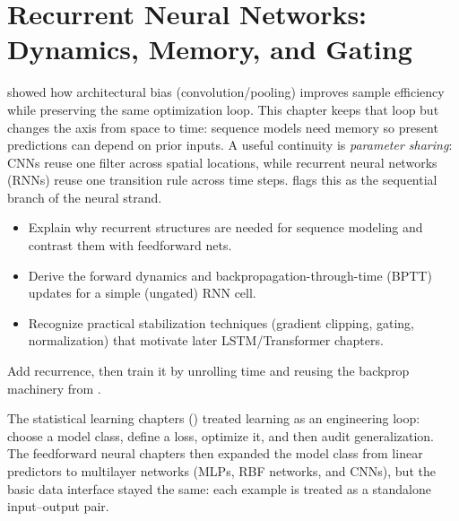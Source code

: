\section{Recurrent Neural Networks: Dynamics, Memory, and Gating}\label{chap:rnn}
\graphicspath{{assets/lec7/}{assets/lec9/}{assets/lec14/}}

 showed how architectural bias (convolution/pooling) improves sample efficiency while preserving the same optimization loop. This chapter keeps that loop but changes the axis from space to time: sequence models need memory so present predictions can depend on prior inputs. A useful continuity is \emph{parameter sharing}: CNNs reuse one filter across spatial locations, while recurrent neural networks (RNNs) reuse one transition rule across time steps.  flags this as the sequential branch of the neural strand.

\begin{tcolorbox}[summarybox, title={Learning Outcomes}]
\begin{itemize}
    \item Explain why recurrent structures are needed for sequence modeling and contrast them with feedforward nets.
    \item Derive the forward dynamics and backpropagation-through-time (BPTT) updates for a simple (ungated) RNN cell.
    \item Recognize practical stabilization techniques (gradient clipping, gating, normalization) that motivate later LSTM/Transformer chapters.
\end{itemize}
\end{tcolorbox}

\begin{tcolorbox}[summarybox, title={Design motif}]
Add recurrence, then train it by unrolling time and reusing the backprop machinery from .
\end{tcolorbox}

The statistical learning chapters () treated learning as an engineering loop: choose a model class, define a loss, optimize it, and then audit generalization. The feedforward neural chapters then expanded the model class from linear predictors to multilayer networks (MLPs, RBF networks, and CNNs), but the basic data interface stayed the same: each example is treated as a standalone input--output pair.

